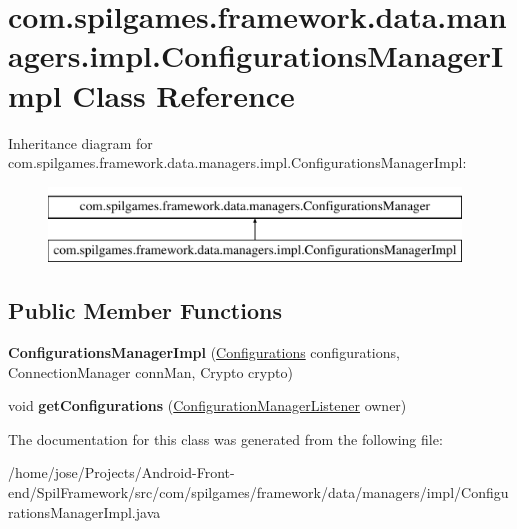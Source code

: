 \hypertarget{classcom_1_1spilgames_1_1framework_1_1data_1_1managers_1_1impl_1_1_configurations_manager_impl}{\section{com.\-spilgames.\-framework.\-data.\-managers.\-impl.\-Configurations\-Manager\-Impl Class Reference}
\label{classcom_1_1spilgames_1_1framework_1_1data_1_1managers_1_1impl_1_1_configurations_manager_impl}
}
Inheritance diagram for com.\-spilgames.\-framework.\-data.\-managers.\-impl.\-Configurations\-Manager\-Impl\-:\begin{figure}[H]
\begin{center}
\leavevmode
\includegraphics[height=2.000000cm]{classcom_1_1spilgames_1_1framework_1_1data_1_1managers_1_1impl_1_1_configurations_manager_impl}
\end{center}
\end{figure}
\subsection*{Public Member Functions}
\begin{DoxyCompactItemize}
\item 
\hypertarget{classcom_1_1spilgames_1_1framework_1_1data_1_1managers_1_1impl_1_1_configurations_manager_impl_a567bf84d5bb648487330427abe166b99}{{\bfseries Configurations\-Manager\-Impl} (\hyperlink{classcom_1_1spilgames_1_1framework_1_1data_1_1_configurations}{Configurations} configurations, Connection\-Manager conn\-Man, Crypto crypto)}\label{classcom_1_1spilgames_1_1framework_1_1data_1_1managers_1_1impl_1_1_configurations_manager_impl_a567bf84d5bb648487330427abe166b99}

\item 
\hypertarget{classcom_1_1spilgames_1_1framework_1_1data_1_1managers_1_1impl_1_1_configurations_manager_impl_acbe9f358ffd36ccec1a3f29b0838db6b}{void {\bfseries get\-Configurations} (\hyperlink{interfacecom_1_1spilgames_1_1framework_1_1data_1_1managers_1_1_configurations_manager_1_1_configuration_manager_listener}{Configuration\-Manager\-Listener} owner)}\label{classcom_1_1spilgames_1_1framework_1_1data_1_1managers_1_1impl_1_1_configurations_manager_impl_acbe9f358ffd36ccec1a3f29b0838db6b}

\end{DoxyCompactItemize}


The documentation for this class was generated from the following file\-:\begin{DoxyCompactItemize}
\item 
/home/jose/\-Projects/\-Android-\/\-Front-\/end/\-Spil\-Framework/src/com/spilgames/framework/data/managers/impl/Configurations\-Manager\-Impl.\-java\end{DoxyCompactItemize}
